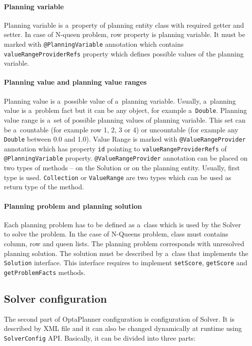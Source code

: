 \paragraph{Planning variable}
Planning variable is a~property of planning entity class with required getter and setter. In case of N-queen problem,
row property is planning variable. It must be marked with \texttt{@PlanningVariable} annotation which contains
\texttt{valueRangeProviderRefs} property which defines possible values of the planning variable.

\paragraph{Planning value and planning value ranges}
Planning value is a~possible value of a~planning variable. Usually, a~planning value is a~problem fact but it can be any
object, for example a~\texttt{Double}. Planning value range is a~set of possible planning values of planning variable.
This set can be a~countable (for example row 1, 2, 3 or 4) or uncountable (for example any \texttt{Double} between 0.0
and 1.0). Value Range is marked with \texttt{@ValueRangeProvider} annotation which has property \texttt{id} pointing to
\texttt{valueRangeProviderRefs} of \texttt{@PlanningVariable} property. \texttt{@ValueRangeProvider} annotation can be
placed on two types of methods -- on the Solution or on the planning entity. Usually, first type is used.
\texttt{Collection} or \texttt{ValueRange} are two types which can be used as return type of the method.

\paragraph{Planning problem and planning solution}
Each planning problem has to be defined as a~class which is used by the Solver to solve the problem. In the case of
N-Queens problem, class must contains column, row and queen lists. The planning problem corresponds with unresolved
planning solution. The solution must be described by a~class that implements the \texttt{Solution} interface. This
interface requires to implement \texttt{setScore}, \texttt{getScore} and \texttt{getProblemFacts} methods.

\subsection{Solver configuration}\label{ScoreConfigSection}
The second part of OptaPlanner configuration is configuration of Solver. It is described by XML file and it can also be
changed dynamically at runtime using \texttt{SolverConfig} API. Basically, it can be divided into three parts:


